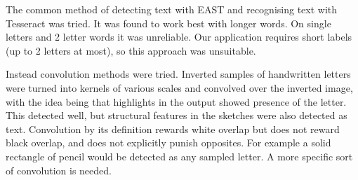 \documentclass[conference]{IEEEtran}
\begin{document}
The common method of detecting text with EAST and recognising text with Tesseract was tried. It was found to work best with longer words. On single letters and 2 letter words it was unreliable. Our application requires short labels (up to 2 letters at most), so this approach was unsuitable.

Instead convolution methods were tried. Inverted samples of handwritten letters were turned into kernels of various scales and convolved over the inverted image, with the idea being that highlights in the output showed presence of the letter. This detected well, but structural features in the sketches were also detected as text. Convolution by its definition rewards white overlap but does not reward black overlap, and does not explicitly punish opposites. For example a solid rectangle of pencil would be detected as any sampled letter. A more specific sort of convolution is needed.
\end{document}
